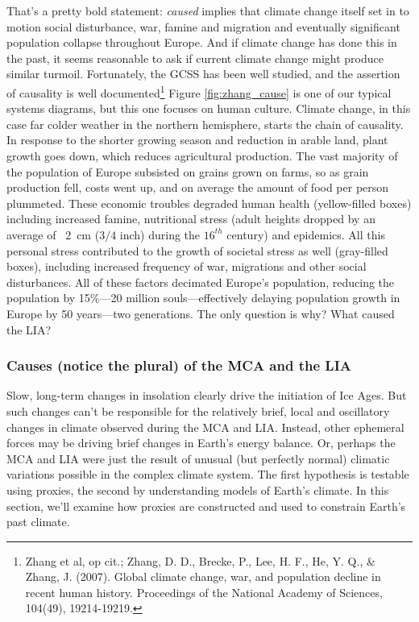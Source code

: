 That's a pretty bold statement: \emph{caused} implies that climate change itself set in to motion social disturbance, war, famine and migration and eventually significant population collapse throughout Europe. And if climate change has done this in the past, it seems reasonable to ask if current climate change might produce similar turmoil. Fortunately, the GCSS has been well studied, and the assertion of causality is well documented\footnote{Zhang et al, op cit.; Zhang, D. D., Brecke, P., Lee, H. F., He, Y. Q., \& Zhang, J. (2007). Global climate change, war, and population decline in recent human history. Proceedings of the National Academy of Sciences, 104(49), 19214-19219.} Figure \ref{fig:zhang_cause} is one of our typical systems diagrams, but this one focuses on human culture. Climate change, in this case far colder weather in the northern hemisphere, starts the chain of causality. In response to the shorter growing season and reduction in arable land, plant growth goes down, which reduces agricultural production. The vast majority of the population of Europe subsisted on grains grown on farms, so as grain production fell, costs went up, and on average the amount of food per person plummeted. These economic troubles degraded human health (yellow-filled boxes) including increased famine, nutritional stress (adult heights dropped by an average of ~\SI{2}{\centi\metre} ($3/4$ inch) during the $16^{th}$ century) and epidemics. All this personal stress contributed to the growth of societal stress as well (gray-filled boxes), including increased frequency of war, migrations and other social disturbances. All of these factors decimated Europe's population, reducing the population by 15\%---20 million souls---effectively delaying population growth in Europe by 50 years---two generations. The only question is why? What caused the LIA?

\subsubsection{Causes (notice the plural) of the MCA and the LIA}
Slow, long-term changes in insolation clearly drive the initiation of Ice Ages. But such changes can't be responsible for the relatively brief, local and oscillatory changes in climate observed during the MCA and LIA. Instead, other ephemeral forces may be driving brief changes in Earth's energy balance. Or, perhaps the MCA and LIA were just the result of unusual (but perfectly normal) climatic variations possible in the complex climate system. The first hypothesis is testable using proxies, the second by understanding models of Earth's climate. In this section, we'll examine how proxies are constructed and used to constrain Earth's past climate. 

